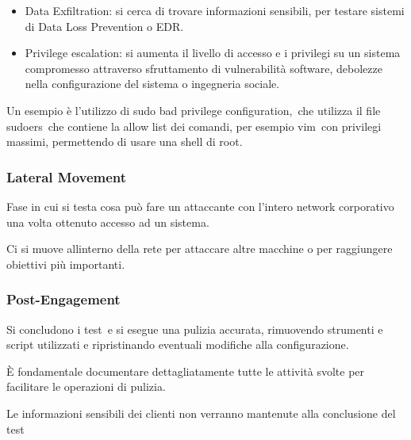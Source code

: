 \documentclass[
]{article}
\providecommand{\tightlist}{%
  \setlength{\itemsep}{0pt}\setlength{\parskip}{0pt}}
\begin{document}
{}

\begin{itemize}
\tightlist
\item
  {Data Exfiltration}{: si cerca di trovare informazioni sensibili, per
  testare sistemi di Data Loss Prevention o EDR.}
\end{itemize}

{}

\begin{itemize}
\tightlist
\item
  {Privilege escalation}{: si aumenta il livello di accesso e i
  privilegi su un sistema compromesso attraverso sfruttamento di
  vulnerabilità software, debolezze nella configurazione del sistema o
  ingegneria sociale. }
\end{itemize}

{Un esempio è l'utilizzo di }{sudo bad privilege
}{configuration}{,}{~che utilizza il file }{sudoers}{~che contiene la
allow list dei comandi, per esempio }{vim}{~con privilegi massimi}{,
}{permettendo di usare una shell di root.}{~}

\subsubsection{\texorpdfstring{{Lateral
Movement}}{Lateral Movement}}\label{h.dqydejigvztv}

{Fase in cui si testa cosa può fare un attaccante con l'intero network
corporativo una volta ottenuto accesso ad un sistema. }

{Ci si muove all\textquotesingle interno della rete per attaccare altre
macchine o per raggiungere obiettivi più importanti.}

\subsubsection{\texorpdfstring{{Post-Engagement}}{Post-Engagement}}\label{h.u5q3kp80giuh}

{Si concludono i test}{~e si esegue una pulizia accurata, rimuovendo
strumenti e script utilizzati e ripristinando eventuali modifiche alla
configurazione.}

{}

{È fondamentale documentare dettagliatamente tutte le attività svolte
per facilitare le operazioni di pulizia.}

{}

{Le informazioni sensibili dei clienti non verranno mantenute alla
conclusione del test}
\end{document}
